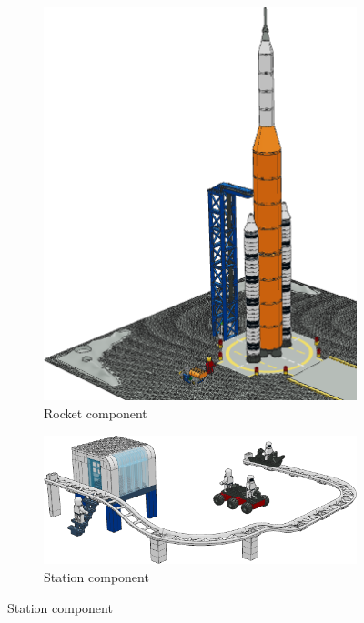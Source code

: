 \documentclass{PDS}
\begin{document}
\begin{figure}[htbp]
    \centering
    \begin{subfigure}[b]{0.2\textwidth}
        \includegraphics[width=\textwidth]{./figures/space_rocket.png}
        \caption{Rocket component}
    \end{subfigure}
    \hspace{0.05\textwidth}
    \begin{subfigure}[b]{0.4\textwidth}
        \includegraphics[width=\textwidth]{./figures/space_station.png}
        \caption{Station component}

\end{subfigure}
\end{figure}
\end{document}

